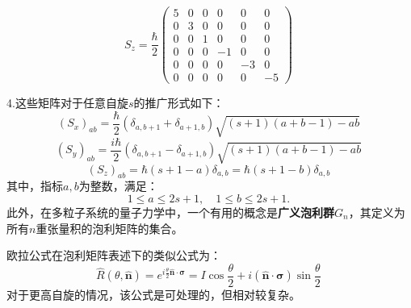 \[
S_z = \frac{\hbar}{2}
\begin{pmatrix}
5 & 0 & 0 & 0 & 0 & 0 \\
0 & 3 & 0 & 0 & 0 & 0 \\
0 & 0 & 1 & 0 & 0 & 0 \\
0 & 0 & 0 & -1 & 0 & 0 \\
0 & 0 & 0 & 0 & -3 & 0 \\
0 & 0 & 0 & 0 & 0 & -5
\end{pmatrix}~
\]

4.这些矩阵对于任意自旋\(s\)的推广形式如下：
\[
(S_x)_{ab} = \frac{\hbar}{2} \left( \delta_{a,b+1} + \delta_{a+1,b} \right) \sqrt{(s+1)(a+b-1) - ab}~
\]
\[
(S_y)_{ab} = \frac{i\hbar}{2} \left( \delta_{a,b+1} - \delta_{a+1,b} \right) \sqrt{(s+1)(a+b-1) - ab}~
\]
\[
(S_z)_{ab} = \hbar (s+1 - a) \delta_{a,b} = \hbar (s+1 - b) \delta_{a,b}~
\]
其中，指标\(a, b\)为整数，满足：
\[
1 \leq a \leq 2s+1, \quad 1 \leq b \leq 2s+1.~
\]
此外，在多粒子系统的量子力学中，一个有用的概念是\textbf{广义泡利群}\(G_n\)，其定义为所有\(n\)重张量积的泡利矩阵的集合。

欧拉公式在泡利矩阵表述下的类似公式为：
\[
\hat{R}(\theta, \hat{\mathbf{n}}) = e^{i \frac{\theta}{2} \hat{\mathbf{n}} \cdot \boldsymbol{\sigma}} = I \cos \frac{\theta}{2} + i \left(\hat{\mathbf{n}} \cdot \boldsymbol{\sigma}\right) \sin \frac{\theta}{2}~
\]
对于更高自旋的情况，该公式是可处理的，但相对较复杂。